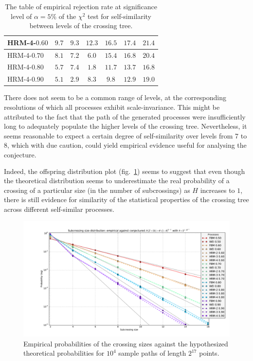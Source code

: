 \documentclass[a4paper]{article}
\begin{document}
\begin{table}[h]
\begin{center}
\begin{tabular}{l||c|c|c|c|c|c|}
	HRM-4-$0.60$ 	& $9.7$ &  $\mathbf{9.3}$ & $12.3$ & $16.5$ & $17.4$ & $21.4$ \\ \hline
	HRM-4-$0.70$ 	& $8.1$ &  $7.2$ &  $\mathbf{6.0}$ & $15.4$ & $16.8$ & $20.4$ \\ \hline
	HRM-4-$0.80$ 	& $5.7$ &  $7.4$ &  $\mathbf{1.8}$ & $11.7$ & $13.7$ & $16.8$ \\ \hline
	HRM-4-$0.90$ 	& $5.1$ &  $\mathbf{2.9}$ &  $8.3$ &  $9.8$ & $12.9$ & $19.0$ \\ \hline\hline

 	\end{tabular}
	\caption{The table of empirical rejection rate at significance level of $\alpha = 5\%$
	of the $\chi^2$ test for self-similarity between levels of the crossing tree. }
\label{tbl:chi_sq_test_for_all_01}
\end{center}\end{table}
There does not seem to be a common range of levels, at the corresponding resolutions of which
all processes exhibit scale-invariance. This might be attributed to the fact that the path
of the generated processes were insufficiently long to adequately populate the higher
levels of the crossing tree. Nevertheless, it seems reasonable to expect a certain degree
of self-similarity over levels from 7 to 8, which with due caution, could yield empirical
evidence useful for analysing the conjecture.

Indeed, the offspring distribution plot (fig.~\ref{fig:all_xing_probs}) seems to
suggest that even though the theoretical distribution seems to underestimate the real
probability of a crossing of a particular size (in the number of subcrossings) as $H$
increases to $1$, there is still evidence for similarity of the statistical properties
of the crossing tree across different self-similar processes.
\begin{figure}[htb]\begin{center}
    \includegraphics[width=6in]{images/fig_02_med_10000-17}
    \caption{Empirical probabilities of the crossing sizes against the hypothesized
    theoretical probabilities for $10^4$ sample paths of length $2^{17}$ points.}
\label{fig:all_xing_probs}
\end{center}\end{figure}
\end{document}
